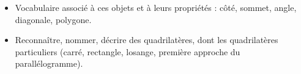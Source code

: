 \begin{prerequis}    
    \begin{itemize}
        \item[\emoji{red-heart}] Vocabulaire associé à ces objets et à leurs propriétés : côté, sommet, angle, diagonale, polygone.
        \columnbreak
        \item[\emoji{diamond-suit}] Reconnaître, nommer, décrire des quadrilatères, dont les quadrilatères particuliers (carré, rectangle, losange, première approche du parallélogramme).
    \end{itemize}
\end{prerequis}